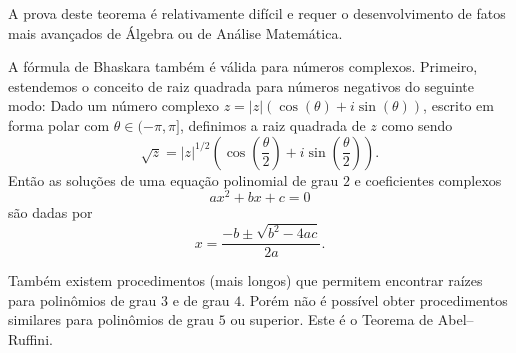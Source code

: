 A prova deste teorema é relativamente difícil e requer o desenvolvimento de fatos mais avançados de Álgebra ou de Análise Matemática.

A fórmula de Bhaskara também é válida para números complexos. Primeiro, estendemos o conceito de raiz quadrada para números negativos do seguinte modo: Dado um número complexo $z=|z|(\cos(\theta)+i\sin(\theta))$, escrito em forma polar com $\theta\in(-\pi,\pi]$, definimos a raiz quadrada de $z$ como sendo
\[\sqrt{z}=|z|^{1/2}\left(\cos\left(\frac{\theta}{2}\right)+i\sin\left(\frac{\theta}{2}\right)\right).\]
Então as soluções de uma equação polinomial de grau $2$ e coeficientes complexos
\[ax^2+bx+c=0\]
são dadas por
\[x=\frac{-b\pm\sqrt{b^2-4ac}}{2a}.\]

Também existem procedimentos (mais longos) que permitem encontrar raízes para polinômios de grau $3$ e de grau $4$. Porém não é possível obter procedimentos similares para polinômios de grau $5$ ou superior. Este é o Teorema de Abel--Ruffini.